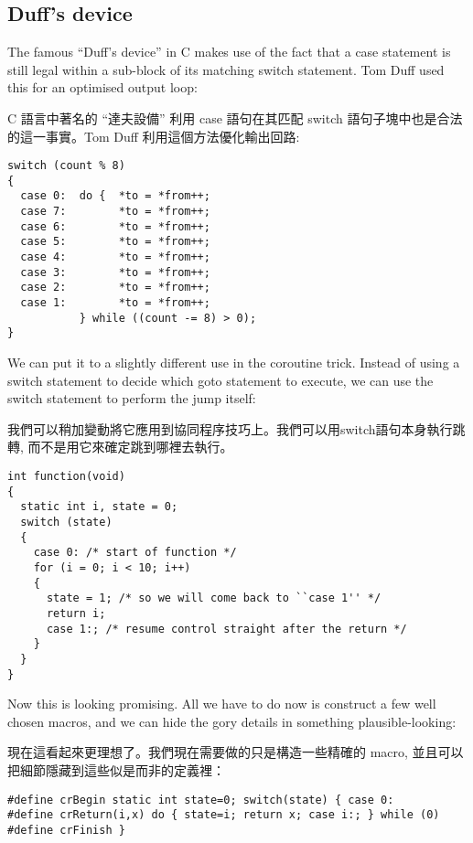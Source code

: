 \documentclass[12pt]{article}
\begin{document}
\begin{CJK}{UTF8}{bsmi}
\section{Duff's device}

The famous ``Duff's device'' in C makes use of the fact that a case statement is still legal within a sub-block of its matching switch statement. Tom Duff used this for an optimised output loop: 

C 語言中著名的 ``達夫設備'' 利用 case 語句在其匹配 switch 語句子塊中也是合法的這一事實。Tom Duff
利用這個方法優化輸出回路:

\begin{lstlisting}[basicstyle=\footnotesize, breaklines=true]
switch (count % 8) 
{
  case 0:  do {  *to = *from++;
  case 7:        *to = *from++;
  case 6:        *to = *from++;
  case 5:        *to = *from++;
  case 4:        *to = *from++;
  case 3:        *to = *from++;
  case 2:        *to = *from++;
  case 1:        *to = *from++;
           } while ((count -= 8) > 0);
}
\end{lstlisting}

We can put it to a slightly different use in the coroutine trick. Instead of using a switch statement to decide which goto statement to execute, we can use the switch statement to perform the jump itself:

我們可以稍加變動將它應用到協同程序技巧上。我們可以用switch語句本身執行跳轉, 而不是用它來確定跳到哪裡去執行。 

\begin{lstlisting}[basicstyle=\footnotesize, breaklines=true]
int function(void) 
{
  static int i, state = 0;
  switch (state) 
  {
    case 0: /* start of function */
    for (i = 0; i < 10; i++) 
    {
      state = 1; /* so we will come back to ``case 1'' */
      return i;
      case 1:; /* resume control straight after the return */
    }
  }
}
\end{lstlisting}

Now this is looking promising. All we have to do now is construct a few well chosen macros, and we can hide the gory details in something plausible-looking:

現在這看起來更理想了。我們現在需要做的只是構造一些精確的 macro, 並且可以把細節隱藏到這些似是而非的定義裡： 

\begin{lstlisting}[basicstyle=\footnotesize, breaklines=true]
#define crBegin static int state=0; switch(state) { case 0:
#define crReturn(i,x) do { state=i; return x; case i:; } while (0)
#define crFinish }


\end{lstlisting}
\end{CJK}
\end{document}
